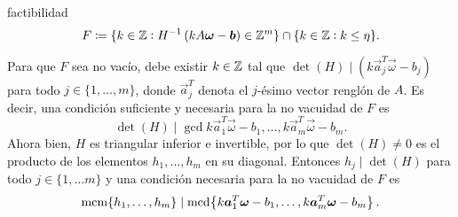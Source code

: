 factibilidad
\begin{equation}
	\label{eq:feas-set}
	F \coloneq \lbrace k \in \mathbb{Z} \vcentcolon H^{-1}\left(kA\boldsymbol{\omega} - \boldsymbol{b}\right) \in \mathbb{Z}^m \rbrace
	\cap \lbrace k \in \mathbb{Z} \vcentcolon k \leq \eta \rbrace.
\end{equation}
\begin{observation}
	Para que $F$ sea no vacío, debe existir $k \in \mathbb{Z}$ tal que $\det(H) \mid (k\vec{a}_j^T
	\vec{\omega} - b_j)$ para todo $j \in \lbrace 1, \ldots, m \rbrace$, donde $\vec{a}^T_j$
	denota el $j$-ésimo vector renglón de $A$. Es decir, una condición suficiente y necesaria para
	la no vacuidad de $F$ es
	\begin{equation*}
		\det(H) \mid \gcd{k\vec{a}_1^T\vec{\omega} - b_1, \ldots, k\vec{a}_m^T\vec{\omega} - b_m}.
	\end{equation*}
	Ahora bien, $H$ es triangular inferior e invertible, por lo que $\det(H) \neq 0$ es el producto
	de los elementos $h_1, \ldots, h_m$ en su diagonal. Entonces $h_j \mid \det(H)$ para todo $j \in
	\lbrace 1, \ldots m \rbrace$ y una condición necesaria para la no vacuidad de $F$ es
	\begin{equation*}
		\mathop{\mathrm{mcm}{\left\lbrace h_1, \ldots, h_m \right\rbrace}} \mid \mathop{\mathrm{mcd}{\left\lbrace k\boldsymbol{a}_1^T\boldsymbol{\omega} - b_1, \ldots, k\boldsymbol{a}_m^T\boldsymbol{\omega} - b_m \right\rbrace}}.
	\end{equation*}
\end{observation}

